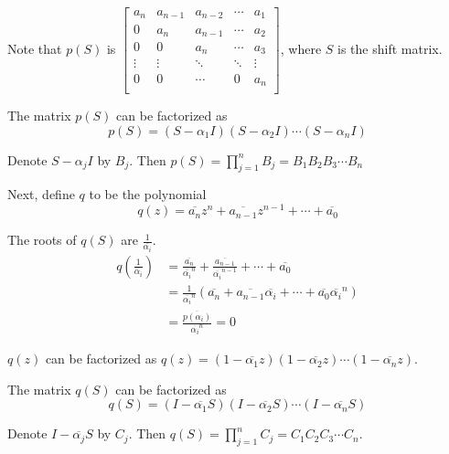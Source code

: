 \documentclass[twofold]{article}
\newcommand*\conj[1]{\overline{#1}}
\newcommand*\adj[1]{#1^*}
\newcommand*\norm[1]{\left \Vert #1 \right\Vert}
\theoremstyle{plain}
\theoremstyle{definition}
\theoremstyle{remark}
\begin{document}
Note that \(p(S) \) is \( \begin{bmatrix} 

a_n & a_{n-1} & a_{n-2} & \cdots & a_1 \\
0 & a_n & a_{n-1} & \cdots & a_2 \\
0 & 0 & a_n & \cdots & a_3 \\
\vdots & \vdots & \ddots &\ddots & \vdots \\
0 & 0 & \cdots & 0 & a_n \\ 
\end{bmatrix}\), where \(S\) is the shift matrix. 


The matrix \(p(S)\) can be factorized as \[p(S) = (S - \alpha_1I) (S - \alpha_2 I) \cdots (S - \alpha_n I)\]

Denote \(S - \alpha_jI\) by \(B_j\). Then \(p(S) =\displaystyle \prod_{j=1}^n B_j = B_1 B_2 B_3 \cdots B_n\)

Next, define \(q\) to be the polynomial 
\[q(z) = \conj{a_n}z^n + \conj{a_{n-1}}z^{n-1} + \cdots + \conj{a_0}\] 

The roots of \(q(S)\) are \(\frac {1}{\conj{\alpha_i}}\). 
\begin{equation*}\begin{split}
q \left(\frac{1}{\conj{\alpha_i}} \right) & = \frac{\conj{a_n}}{\conj{\alpha_i}^n} + \frac{\conj{a_{n-1}}}{\conj{\alpha_i}^{n-1}} + \cdots + \conj{a_0} \\
& = \frac{1}{\conj{\alpha_i}^n} (\conj{a_n} + \conj{a_{n-1}} \conj{\alpha_i} + \cdots + \conj{a_0} \conj{\alpha_i}^n) \\
& = \frac{\conj{p(\alpha_i)}}{\conj{\alpha_i}^n} = 0
\end{split}\end{equation*}

\(q(z)\) can be factorized as \(q(z) = (1 - \conj{\alpha_1}z) (1 - \conj{\alpha_2}z) \cdots (1 - \conj{\alpha_n}z)\). 

The matrix \(q(S)\) can be factorized as
\[q(S) = (I - \conj{\alpha_1}S) (I - \conj{\alpha_2}S) \cdots (I - \conj{\alpha_n}S)\]

 Denote \( I -  \conj{\alpha_j} S\) by \(C_j\). Then \(q(S) =\displaystyle \prod_{j=1}^n C_j = C_1 C_2 C_3 \cdots C_n\).


\end{document}
